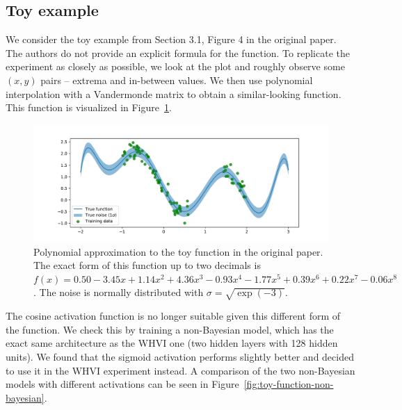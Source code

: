 \documentclass[11pt, twocolumn]{article}
\begin{document}
    \subsection{Toy example}\label{sec:toy-example}
    We consider the toy example from Section 3.1, Figure 4 in the original paper.
    The authors do not provide an explicit formula for the function.
    To replicate the experiment as closely as possible, we look at the plot and roughly observe some $(x, y)$ pairs -- extrema and in-between values.
    We then use polynomial interpolation with a Vandermonde matrix to obtain a similar-looking function.
    This function is visualized in Figure~\ref{fig:toy-function}.

    \begin{figure}[h]
        \centering
        \includegraphics[width=1.0\hsize]{img/toy-function.pdf}
        \caption{Polynomial approximation to the toy function in the original paper.
        The exact form of this function up to two decimals is $f(x) = 0.50 -3.45x + 1.14x^2 + 4.36x^3 -0.93x^4 -1.77x^5 + 0.39x^6 + 0.22x^7 -0.06x^8$. The noise is normally distributed with $\sigma = \sqrt{\exp (-3)}$.
        }
        \label{fig:toy-function}
    \end{figure}

    The cosine activation function is no longer suitable given this different form of the function.
    We check this by training a non-Bayesian model, which has the exact same architecture as the WHVI one (two hidden layers with 128 hidden units).
    We found that the sigmoid activation performs slightly better and decided to use it in the WHVI experiment instead.
    A comparison of the two non-Bayesian models with different activations can be seen in Figure~\ref{fig:toy-function-non-bayesian}.
\end{document}
